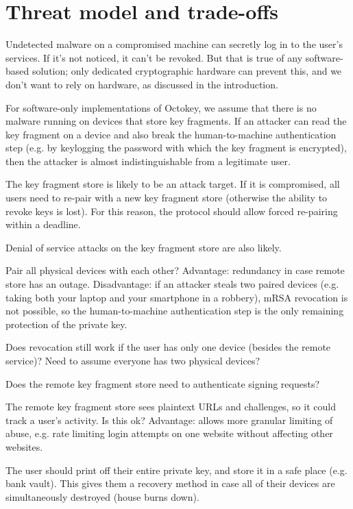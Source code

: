 \section{Threat model and trade-offs}\label{sec:threat}

Undetected malware on a compromised machine can secretly log in to the user's services. If it's not
noticed, it can't be revoked. But that is true of any software-based solution; only dedicated
cryptographic hardware can prevent this, and we don't want to rely on hardware, as discussed in the
introduction.

For software-only implementations of Octokey, we assume that there is no malware running on devices
that store key fragments. If an attacker can read the key fragment on a device and also break the
human-to-machine authentication step (e.g. by keylogging the password with which the key fragment is
encrypted), then the attacker is almost indistinguishable from a legitimate user.

The key fragment store is likely to be an attack target. If it is compromised, all users need to
re-pair with a new key fragment store (otherwise the ability to revoke keys is lost). For this
reason, the protocol should allow forced re-pairing within a deadline.

Denial of service attacks on the key fragment store are also likely.

Pair all physical devices with each other? Advantage: redundancy in case remote store has an outage.
Disadvantage: if an attacker steals two paired devices (e.g. taking both your laptop and your
smartphone in a robbery), mRSA revocation is not possible, so the human-to-machine authentication
step is the only remaining protection of the private key.

Does revocation still work if the user has only one device (besides the remote service)?
Need to assume everyone has two physical devices?

Does the remote key fragment store need to authenticate signing requests?

The remote key fragment store sees plaintext URLs and challenges, so it could track a user's
activity. Is this ok? Advantage: allows more granular limiting of abuse, e.g. rate limiting login
attempts on one website without affecting other websites.

The user should print off their entire private key, and store it in a safe place (e.g. bank vault).
This gives them a recovery method in case all of their devices are simultaneously destroyed (house
burns down).

